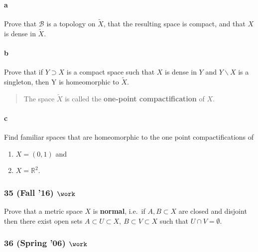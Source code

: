 \hypertarget{a-10}{%
\paragraph{a}\label{a-10}}

Prove that \({\mathcal{B}}\) is a topology on \(\tilde X\), that the
resulting space is compact, and that \(X\) is dense in \(\tilde X\).

\hypertarget{b-10}{%
\paragraph{b}\label{b-10}}

Prove that if \(Y \supset X\) is a compact space such that \(X\) is
dense in \(Y\) and \(Y \backslash X\) is a singleton, then Y is
homeomorphic to \(\tilde X\).

\begin{quote}
The space \(\tilde X\) is called the \textbf{one-point compactification}
of \(X\).
\end{quote}

\hypertarget{c}{%
\paragraph{c}\label{c}}

Find familiar spaces that are homeomorphic to the one point
compactifications of

\begin{enumerate}
\def\labelenumi{\roman{enumi}.}
\item
  \(X = (0, 1)\) and
\item
  \(X = {\mathbb{R}}^2\).
\end{enumerate}

\hypertarget{fall-16-work-1}{%
\subsubsection{\texorpdfstring{35 (Fall '16)
\(\work\)}{35 (Fall '16) \textbackslash work}}\label{fall-16-work-1}}

Prove that a metric space \(X\) is \textbf{normal}, i.e.~if
\(A, B \subset X\) are closed and disjoint then there exist open sets
\(A \subset U \subset X, ~B \subset V \subset X\) such that
\(U \cap V = \emptyset\).

\hypertarget{spring-06-work-1}{%
\subsubsection{\texorpdfstring{36 (Spring '06)
\(\work\)}{36 (Spring '06) \textbackslash work}}\label{spring-06-work-1}}

